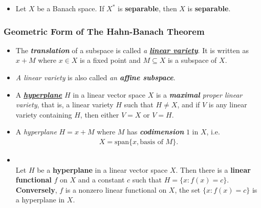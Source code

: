 \documentclass[11pt]{article}
\begin{document}
\begin{itemize}
\item \begin{proposition}
Let $X$ be a Banach space. If $X^{*}$ is \textbf{separable}, then $X$ is \textbf{separable}.
\end{proposition}
\end{itemize}

\subsubsection{Geometric Form of The Hahn-Banach Theorem}
\begin{itemize}
\item \begin{definition}
The \emph{\textbf{translation}} of a subspace is called \emph{a \underline{\textbf{linear variety}}}. It is written as $x + M$ where $x\in X$ is a fixed point and $M\subseteq X$ is a subspace of $X$.
\end{definition}

\item \begin{remark}
\emph{A linear variety} is also called \emph{an \textbf{affine subspace}}.
\end{remark}

\item \begin{definition}
A \underline{\emph{\textbf{hyperplane}}} $H$ in a linear vector space $X$ is a \emph{\textbf{maximal} proper linear variety}, that is, a linear variety $H$ such that $H \neq X$, and if $V$ is any linear variety containing $H$, then either $V = X$ or $V = H$.
\end{definition}

\item \begin{remark}
A \emph{hyperplane} $H = x + M$ where $M$ has \emph{\textbf{codimension}} $1$ in $X$, i.e. 
\begin{align*}
X = \text{span}\{x, \text{basis of }M\}.
\end{align*}
\end{remark}

\item \begin{proposition} \citep{luenberger1997optimization}\\
Let $H$ be a \textbf{hyperplane} in a linear vector space $X$. Then there is a \textbf{linear functional} $f$ on $X$ and a constant $c$ such that $H =\{x: f(x) =c\}$.
\textbf{Conversely}, $f$ is a nonzero linear functional on $X$, the set $\{x: f(x) =c\}$ is a hyperplane in $X$.
\end{proposition}


\end{itemize}
\end{document}
